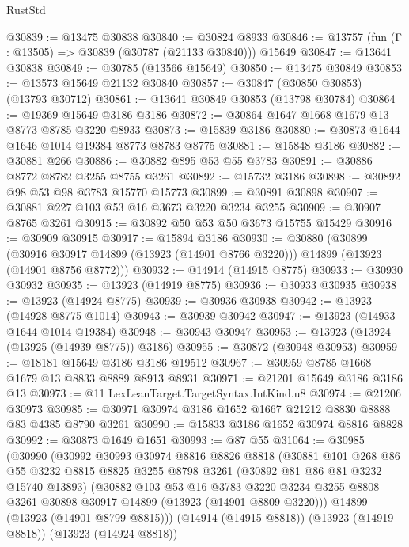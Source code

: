 \begin{lexlean}{RustStd}
\begin{coremodule}
@30839 := @13475 @30838
@30840 := @30824 @8933
@30846 := @13757 (fun (Γ : @13505) => @30839 (@30787 (@21133 @30840))) @15649
@30847 := @13641 @30838
@30849 := @30785 (@13566 @15649)
@30850 := @13475 @30849
@30853 := @13573 @15649 @21132 @30840
@30857 := @30847 (@30850 @30853) (@13793 @30712)
@30861 := @13641 @30849 @30853 (@13798 @30784)
@30864 := @19369 @15649 @3186 @3186
@30872 := @30864 @1647 @1668 @1679 @13 @8773 @8785 @3220 @8933
@30873 := @15839 @3186
@30880 := @30873 @1644 @1646 @1014 @19384 @8773 @8783 @8775
@30881 := @15848 @3186
@30882 := @30881 @266
@30886 := @30882 @895 @53 @55 @3783
@30891 := @30886 @8772 @8782 @3255 @8755 @3261
@30892 := @15732 @3186
@30898 := @30892 @98 @53 @98 @3783 @15770 @15773
@30899 := @30891 @30898
@30907 := @30881 @227 @103 @53 @16 @3673 @3220 @3234 @3255
@30909 := @30907 @8765 @3261
@30915 := @30892 @50 @53 @50 @3673 @15755 @15429
@30916 := @30909 @30915
@30917 := @15894 @3186
@30930 := @30880
    (@30899
      (@30916 @30917 @14899 (@13923 (@14901 @8766 @3220)))
      @14899
      (@13923 (@14901 @8756 @8772)))
@30932 := @14914 (@14915 @8775)
@30933 := @30930 @30932
@30935 := @13923 (@14919 @8775)
@30936 := @30933 @30935
@30938 := @13923 (@14924 @8775)
@30939 := @30936 @30938
@30942 := @13923 (@14928 @8775 @1014)
@30943 := @30939 @30942
@30947 := @13923 (@14933 @1644 @1014 @19384)
@30948 := @30943 @30947
@30953 := @13923 (@13924 (@13925 (@14939 @8775)) @3186)
@30955 := @30872 (@30948 @30953)
@30959 := @18181 @15649 @3186 @3186 @19512
@30967 := @30959 @8785 @1668 @1679 @13 @8833 @8889 @8913 @8931
@30971 := @21201 @15649 @3186 @3186 @13
@30973 := @11 LexLeanTarget.TargetSyntax.IntKind.u8
@30974 := @21206 @30973
@30985 := @30971 @30974 @3186 @1652 @1667 @21212 @8830 @8888 @83 @4385 @8790 @3261
@30990 := @15833 @3186 @1652 @30974 @8816 @8828
@30992 := @30873 @1649 @1651
@30993 := @87 @55
@31064 := @30985
    (@30990
      (@30992
        @30993
        @30974
        @8816
        @8826
        @8818
        (@30881
          @101
          @268
          @86
          @55
          @3232
          @8815
          @8825
          @3255
          @8798
          @3261
          (@30892 @81 @86 @81 @3232 @15740 @13893)
          (@30882
            @103
            @53
            @16
            @3783
            @3220
            @3234
            @3255
            @8808
            @3261
            @30898
            @30917
            @14899
            (@13923 (@14901 @8809 @3220)))
          @14899
          (@13923 (@14901 @8799 @8815)))
        (@14914 (@14915 @8818))
        (@13923 (@14919 @8818))
        (@13923 (@14924 @8818))

\end{coremodule}
\end{lexlean}

